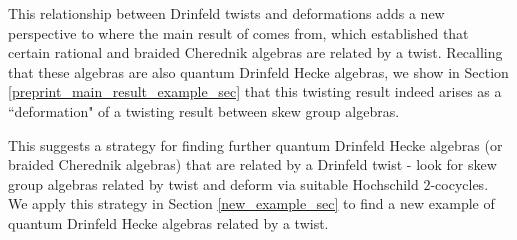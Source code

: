 \documentclass[10pt]{article}
\newcommand{\bb}{\medbreak}
\newcommand{\nt}{\noindent}
\newcommand{\al}{\alpha}
\theoremstyle{definition}
\begin{document}


\nt This relationship between Drinfeld twists and deformations adds a new perspective to where the main result of \cite{twistsrcas} comes from, which established that certain rational and braided Cherednik algebras are related by a twist. Recalling that these algebras are also quantum Drinfeld Hecke algebras, we show in Section \ref{preprint_main_result_example_sec} that this twisting result indeed arises as a ``deformation" of a twisting result between skew group algebras.\bb

\nt This suggests a strategy for finding further quantum Drinfeld Hecke algebras (or braided Cherednik algebras) that are related by a Drinfeld twist - look for skew group algebras related by twist and deform via suitable Hochschild $2$-cocycles. We apply this strategy in Section \ref{new_example_sec} to find a new example of quantum Drinfeld Hecke algebras related by a twist.
\end{document}
